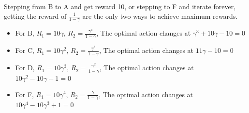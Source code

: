 \begin{exercise}[]
\begin{solution}
\begin{enumerate}
{          Stepping from B to A and get reward 10, or stepping to F and iterate forever, getting the reward of $\frac{1}{1-\gamma}$ are the only two ways to achieve maximum rewards.

          \begin{itemize}
              \item For B, $R_1 = 10\gamma$, $R_2 = \frac{\gamma^4}{1-\gamma}$, The optimal action changes at $\gamma^3 + 10 \gamma -10 =0$
              \item For C, $R_1 = 10\gamma^2$, $R_2 = \frac{\gamma^3}{1-\gamma}$, The optimal action changes at $11\gamma - 10 = 0$
              \item For D, $R_1 = 10\gamma^3$, $R_2 = \frac{\gamma^2}{1-\gamma}$, The optimal action changes at $10\gamma^2 - 10\gamma + 1 = 0$
              \item For F, $R_1 = 10\gamma^4$, $R_2 = \frac{\gamma}{1-\gamma}$, The optimal action changes at $10\gamma^4 - 10\gamma^3 + 1 = 0$
          \end{itemize}


      }
  \end{enumerate}
  \end{solution}
  \label{ex4}
\end{exercise}